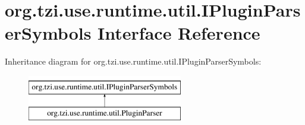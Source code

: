 \hypertarget{interfaceorg_1_1tzi_1_1use_1_1runtime_1_1util_1_1_i_plugin_parser_symbols}{\section{org.\-tzi.\-use.\-runtime.\-util.\-I\-Plugin\-Parser\-Symbols Interface Reference}
\label{interfaceorg_1_1tzi_1_1use_1_1runtime_1_1util_1_1_i_plugin_parser_symbols}
}
Inheritance diagram for org.\-tzi.\-use.\-runtime.\-util.\-I\-Plugin\-Parser\-Symbols\-:\begin{figure}[H]
\begin{center}
\leavevmode
\includegraphics[height=2.000000cm]{interfaceorg_1_1tzi_1_1use_1_1runtime_1_1util_1_1_i_plugin_parser_symbols}
\end{center}
\end{figure}
